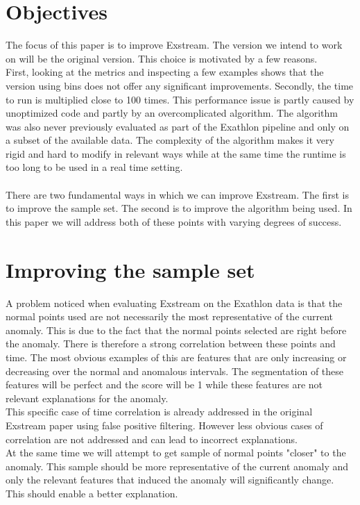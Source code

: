 \documentclass[oneside, a4paper, onecolumn, 11pt]{article}
\begin{document}
\section{Objectives}
The focus of this paper is to improve Exstream. The version we intend to work on will be the original version. This choice is motivated by a few reasons. \\
First, looking at the metrics and inspecting a few examples shows that the version using bins does not offer any significant improvements. 
Secondly, the time to run is multiplied close to 100 times. This performance issue is partly caused by unoptimized code and partly by an overcomplicated algorithm. The algorithm was also never previously evaluated as part of the Exathlon pipeline and only on a subset of the available data. 
The complexity of the algorithm makes it very rigid and hard to modify in relevant ways while at the same time the runtime is too long to be used in a real time setting.\\\\
There are two fundamental ways in which we can improve Exstream. The first is to improve the sample set. The second is to improve the algorithm being used. In this paper we will address both of these points with varying degrees of success.\\
\section{Improving the sample set}
A problem noticed when evaluating Exstream on the Exathlon data is that the normal points used are not necessarily the most representative of the current anomaly. This is due to the fact that the normal points selected are right before the anomaly. There is therefore a strong correlation between these points and time. The most obvious examples of this are features that are only increasing or decreasing over the normal and anomalous intervals. The segmentation of these features will be perfect and the score will be 1 while these features are not relevant explanations for the anomaly.\\
This specific case of time correlation is already addressed in the original Exstream paper using false positive filtering. However less obvious cases of correlation are not addressed and can lead to incorrect explanations.\\
At the same time we will attempt to get sample of normal points "closer" to the anomaly. This sample should be more representative of the current anomaly and only the relevant features that induced the anomaly will significantly change. This should enable a better explanation.\\
\end{document}
